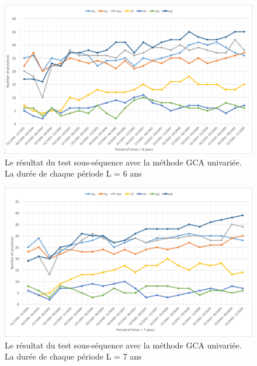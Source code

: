 \begin{figure}[h]
\begin{center}
\includegraphics[width = \linewidth]{../figures/chap5/uni_6.png}
\caption{Le résultat du test sous-séquence avec la méthode GCA univariée. La durée de chaque période L = 6 ans }
\label{fig_uni6}	
\end{center}
\end{figure}


\begin{figure}[h]
\begin{center}
\includegraphics[width = \linewidth]{../figures/chap5/uni_7.png}
\caption{Le résultat du test sous-séquence avec la méthode GCA univariée. La durée de chaque période L = 7 ans }
\label{fig_uni7}	
\end{center}
\end{figure}

